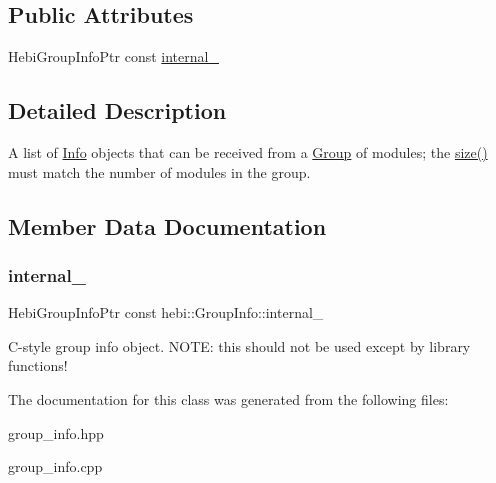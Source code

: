 \subsection*{Public Attributes}
\begin{DoxyCompactItemize}
\item 
Hebi\+Group\+Info\+Ptr const \hyperlink{classhebi_1_1GroupInfo_a35246a60a176870a343eb109e85fcfdf}{internal\+\_\+}
\end{DoxyCompactItemize}


\subsection{Detailed Description}
A list of \hyperlink{classhebi_1_1Info}{Info} objects that can be received from a \hyperlink{classhebi_1_1Group}{Group} of modules; the \hyperlink{classhebi_1_1GroupInfo_a40fad914850d6fdf6273cdd780cd172c}{size()} must match the number of modules in the group. 

\subsection{Member Data Documentation}
\mbox{\label{classhebi_1_1GroupInfo_a35246a60a176870a343eb109e85fcfdf}} 
\subsubsection{\texorpdfstring{internal\+\_\+}{internal\_}}
{\footnotesize\ttfamily Hebi\+Group\+Info\+Ptr const hebi\+::\+Group\+Info\+::internal\+\_\+}

C-\/style group info object. N\+O\+TE\+: this should not be used except by library functions! 

The documentation for this class was generated from the following files\+:\begin{DoxyCompactItemize}
\item 
group\+\_\+info.\+hpp\item 
group\+\_\+info.\+cpp\end{DoxyCompactItemize}
